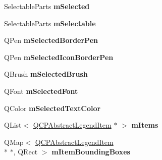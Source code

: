 \begin{DoxyCompactItemize}
\item 
\hypertarget{classQCPLegend_a735cbf24a0cd72b712bb01dfa7d909b2}{Selectable\-Parts {\bfseries m\-Selected}}\label{classQCPLegend_a735cbf24a0cd72b712bb01dfa7d909b2}

\item 
\hypertarget{classQCPLegend_ad8d87239c5522b661b788d00b6f8c7ce}{Selectable\-Parts {\bfseries m\-Selectable}}\label{classQCPLegend_ad8d87239c5522b661b788d00b6f8c7ce}

\item 
\hypertarget{classQCPLegend_a62906c996906ae23e9f724b6ac1f7334}{Q\-Pen {\bfseries m\-Selected\-Border\-Pen}}\label{classQCPLegend_a62906c996906ae23e9f724b6ac1f7334}

\item 
\hypertarget{classQCPLegend_a7429ac0e64c7b90b649b4d8f4cc5fa55}{Q\-Pen {\bfseries m\-Selected\-Icon\-Border\-Pen}}\label{classQCPLegend_a7429ac0e64c7b90b649b4d8f4cc5fa55}

\item 
\hypertarget{classQCPLegend_ab3c7567c86d4784b1e48f76a84b3a1e2}{Q\-Brush {\bfseries m\-Selected\-Brush}}\label{classQCPLegend_ab3c7567c86d4784b1e48f76a84b3a1e2}

\item 
\hypertarget{classQCPLegend_a86ce8f6c20a2f51a48eaf3c24ce16805}{Q\-Font {\bfseries m\-Selected\-Font}}\label{classQCPLegend_a86ce8f6c20a2f51a48eaf3c24ce16805}

\item 
\hypertarget{classQCPLegend_a6c25c8796c6e73e983aae6024965f2be}{Q\-Color {\bfseries m\-Selected\-Text\-Color}}\label{classQCPLegend_a6c25c8796c6e73e983aae6024965f2be}

\item 
\hypertarget{classQCPLegend_a9ae61eaf9434d9f315696bf03c8e4455}{Q\-List$<$ \hyperlink{classQCPAbstractLegendItem}{Q\-C\-P\-Abstract\-Legend\-Item} $\ast$ $>$ {\bfseries m\-Items}}\label{classQCPLegend_a9ae61eaf9434d9f315696bf03c8e4455}

\item 
\hypertarget{classQCPLegend_ae3cf93cee4fa6e7b1966e3c5597004c3}{Q\-Map$<$ \hyperlink{classQCPAbstractLegendItem}{Q\-C\-P\-Abstract\-Legend\-Item} \\*
$\ast$, Q\-Rect $>$ {\bfseries m\-Item\-Bounding\-Boxes}}\label{classQCPLegend_ae3cf93cee4fa6e7b1966e3c5597004c3}

\end{DoxyCompactItemize}
